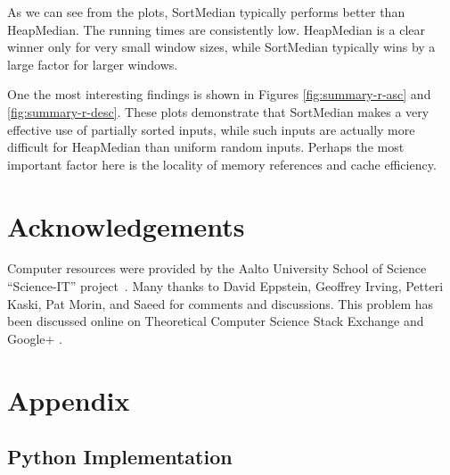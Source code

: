 \documentclass[a4paper,11pt]{article}
\begin{document}
As we can see from the plots, SortMedian typically performs better than HeapMedian. The running times are consistently low. HeapMedian is a clear winner only for very small window sizes, while SortMedian typically wins by a large factor for larger windows.

One the most interesting findings is shown in Figures \ref{fig:summary-r-asc} and \ref{fig:summary-r-desc}. These plots demonstrate that SortMedian makes a very effective use of partially sorted inputs, while such inputs are actually more difficult for HeapMedian than uniform random inputs. Perhaps the most important factor here is the locality of memory references and cache efficiency.


\section*{Acknowledgements}

Computer resources were provided by the Aalto University School of Science ``Science-IT'' project~. Many thanks to David Eppstein, Geoffrey Irving, Petteri Kaski, Pat Morin, and Saeed for comments and discussions. This problem has been discussed online on Theoretical Computer Science Stack Exchange  and Google+ .

\setlength{\bibsep}{5pt}


{
\renewcommand{\section}{\subsection}
}

\newpage
\appendix
\section{Appendix}

\subsection{Python Implementation}\label{app:python}



\newpage
\end{document}

